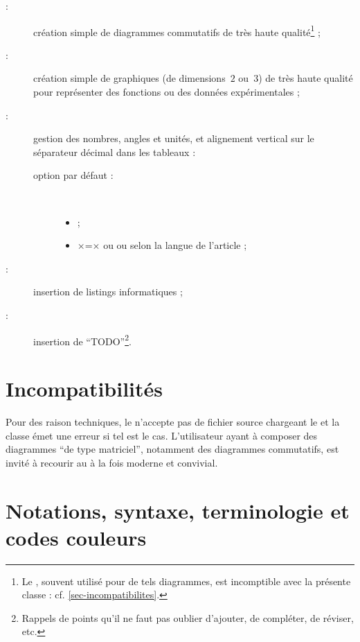 \documentclass[french,nolocaltoc]{nwejmart}
\newtheorem[style=definition]{fait}
\newtheorem[title=contraventionnalisation]{ctrv}
\newtheorem[title-plural=anneaux]{anneau}
\newtheorem[title-plural=idéaux]{idéal}
\begin{document}
\begin{description}
\item[ :] création simple de diagrammes commutatifs de très
  haute qualité\footnote{Le , souvent utilisé pour de tels
    diagrammes, est incomptible avec la présente classe :
    cf. \vref{sec-incompatibilites}.} ;
\item[ :] création simple de graphiques (de dimensions~$2$
  ou~$3$) de très haute qualité pour représenter des fonctions ou des données
  expérimentales ;
\item[ :] gestion des nombres, angles et unités, et alignement
  vertical sur le séparateur décimal dans les tableaux :
  \begin{description}
  \item[option par défaut :]\
    \begin{itemize}
    \item {} ;
    \item {}×=× ou  ou 
      selon la langue de l'article ;
    \end{itemize}
  \end{description}
\item[ :] insertion de listings informatiques ;
\item[\package{todonotes} :] insertion de \enquote{TODO}\footnote{Rappels de
    points qu'il ne faut pas oublier d'ajouter, de compléter, de réviser, etc.}.
\end{description}

\section{Incompatibilités}
\label{sec-incompatibilites}

Pour des raison techniques, le \nwejm{} n'accepte pas de fichier source
\file{.tex} chargeant le \Package{xy} et la classe \nwejmauthor{} émet une
erreur si tel est le cas. L'utilisateur ayant à composer des diagrammes
\enquote{de type matriciel}, notamment des diagrammes commutatifs, est invité
à recourir au \Package{tikz-cd} à la fois moderne et convivial.

\section{Notations, syntaxe, terminologie et codes couleurs}\label{sec-synt-term-notat}
\end{document}
